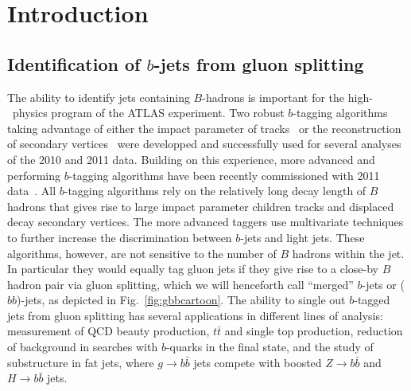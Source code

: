%
%
\chapter{Introduction}


\section{Identification of $b$-jets from gluon splitting}\label{sec:introduction}


The ability to identify jets containing $B$-hadrons is important for the high-\pt\ physics program of the ATLAS experiment. Two robust $b$-tagging algorithms taking
advantage of either the impact parameter of tracks~\cite{ATLAS-CONF-2010-091} or the reconstruction of secondary vertices~\cite{ATLAS-CONF-2010-042} were developped and successfully used for several analyses of the 2010 and 2011 data. Building on this experience, more advanced and performing $b$-tagging algorithms have been recently commissioned with 2011 data~\cite{ATLAS-CONF-2011-102}.
All $b$-tagging algorithms rely on the relatively long decay length of $B$ hadrons that gives rise to large impact parameter children tracks and displaced decay secondary vertices. The more advanced taggers %
use multivariate techniques %
to further increase the discrimination between $b$-jets and light jets. These algorithms, however, are not sensitive to the number of $B$ hadrons within the jet. In particular they would equally tag gluon jets if they give rise to a close-by $B$ hadron pair via gluon splitting, which we will henceforth call ``merged'' $b$-jets or ($bb$)-jets, as depicted in Fig.~\ref{fig:gbbcartoon}. The ability to single out $b$-tagged jets from gluon splitting has several applications in different lines of analysis: measurement of QCD beauty production, $t\bar{t}$ and single top production, reduction of background in searches with $b$-quarks in the final state, and the study of substructure in fat jets, where $g\rightarrow b\bar{b}$ jets compete with boosted $Z\rightarrow b\bar{b}$ and $H\rightarrow b\bar{b}$ jets.
